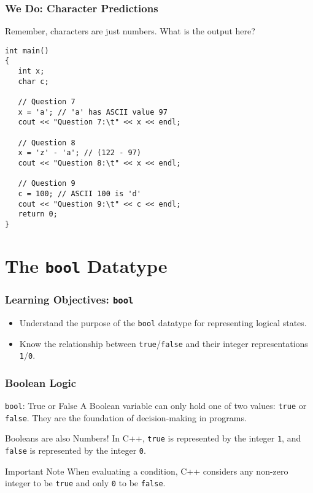 \documentclass{beamer}
\begin{document}
\begin{frame}[fragile]
\frametitle{We Do: Character Predictions}
Remember, characters are just numbers. What is the output here?
\begin{verbatim}
int main()
{
   int x;
   char c;

   // Question 7
   x = 'a'; // 'a' has ASCII value 97
   cout << "Question 7:\t" << x << endl;

   // Question 8
   x = 'z' - 'a'; // (122 - 97)
   cout << "Question 8:\t" << x << endl;

   // Question 9
   c = 100; // ASCII 100 is 'd'
   cout << "Question 9:\t" << c << endl;
   return 0;
}
\end{verbatim}
\end{frame}

\section{The \texttt{bool} Datatype}

\begin{frame}
\frametitle{Learning Objectives: \texttt{bool}}
\begin{itemize}
    \item Understand the purpose of the \texttt{bool} datatype for representing logical states.
    \item Know the relationship between \texttt{true}/\texttt{false} and their integer representations \texttt{1}/\texttt{0}.
\end{itemize}
\end{frame}

\begin{frame}
\frametitle{Boolean Logic}
\begin{block}{\texttt{bool}: True or False}
A Boolean variable can only hold one of two values: \texttt{true} or \texttt{false}. They are the foundation of decision-making in programs.
\end{block}

\begin{alertblock}{Booleans are also Numbers!}
In C++, \texttt{true} is represented by the integer \texttt{1}, and \texttt{false} is represented by the integer \texttt{0}.
\end{alertblock}

\begin{exampleblock}{Important Note}
When evaluating a condition, C++ considers any non-zero integer to be \texttt{true} and only \texttt{0} to be \texttt{false}.
\end{exampleblock}
\end{frame}
\end{document}

